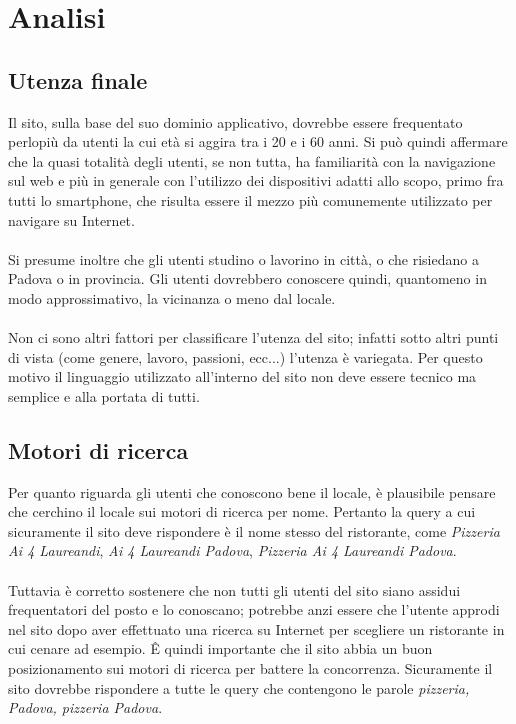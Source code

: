\section{Analisi}

\subsection{Utenza finale}
Il sito, sulla base del suo dominio applicativo, dovrebbe essere frequentato perlopiù da utenti la cui età
si aggira tra i 20 e i 60 anni. Si può quindi affermare
che la quasi totalità degli utenti, se non tutta, ha familiarità con la navigazione sul web e più in
generale con l'utilizzo dei dispositivi adatti allo scopo, primo fra tutti lo smartphone, che risulta
essere il mezzo più comunemente utilizzato per navigare su Internet.\\
\\
Si presume inoltre che gli utenti studino o lavorino in città, o che risiedano a Padova o in provincia. Gli 
utenti dovrebbero conoscere quindi, quantomeno in modo approssimativo, la vicinanza o meno dal locale.\\
\\
Non ci sono altri fattori per classificare l'utenza del sito; infatti sotto altri punti di vista (come
genere, lavoro, passioni, ecc...) l'utenza è variegata. Per questo motivo il linguaggio utilizzato
all'interno del sito non deve essere tecnico ma semplice e alla portata di tutti.

\subsection{Motori di ricerca}
Per quanto riguarda gli utenti che conoscono bene il locale, è plausibile pensare che cerchino il
locale sui motori di ricerca per nome. Pertanto la query a cui sicuramente il sito deve rispondere è
il nome stesso del ristorante, come \textit{Pizzeria Ai 4 Laureandi}, \textit{Ai 4 Laureandi Padova},
\textit{Pizzeria Ai 4 Laureandi Padova}.\\
\\
Tuttavia è corretto sostenere che non tutti gli utenti del sito siano assidui frequentatori del posto e lo
conoscano; potrebbe anzi essere che l'utente approdi nel sito dopo aver effettuato una ricerca su Internet
per scegliere un ristorante in cui cenare ad esempio. Ê quindi importante che il sito abbia
un buon posizionamento sui motori di ricerca per battere la concorrenza. Sicuramente il sito dovrebbe
rispondere a tutte le query che contengono le parole \textit{pizzeria, Padova, pizzeria Padova}.